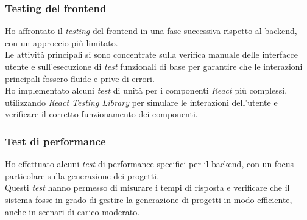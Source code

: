 \subsubsection{Testing del \gls{frontend}}  
Ho affrontato il \textit{testing} del \gls{frontend} in una fase successiva rispetto al \gls{backend}, con un approccio più limitato.\\
Le attività principali si sono concentrate sulla verifica manuale delle interfacce utente e sull’esecuzione di \textit{test} funzionali di base per garantire che le interazioni principali fossero fluide e prive di errori.\\
Ho implementato alcuni \textit{test} di unità per i componenti \textit{React} più complessi, utilizzando \textit{React Testing Library} per simulare le interazioni dell'utente e verificare il corretto funzionamento dei componenti.\\

\subsubsection{Test di performance}  
Ho effettuato alcuni \textit{test} di performance specifici per il \gls{backend}, con un focus particolare sulla generazione dei progetti.\\
Questi \textit{test} hanno permesso di misurare i tempi di risposta e verificare che il sistema fosse in grado di gestire la generazione di progetti in modo efficiente, anche in scenari di carico moderato.\\
